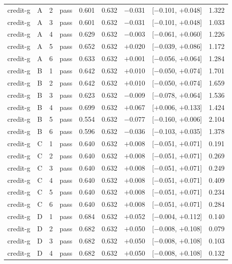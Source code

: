 {\begin{longtable}{lccl rrrcr}
credit-g & A & 2 & pass & 0.601 & 0.632 & $-$0.031 & [$-$0.101, $+$0.048] & 1.322 \\
credit-g & A & 3 & pass & 0.601 & 0.632 & $-$0.031 & [$-$0.101, $+$0.048] & 1.033 \\
credit-g & A & 4 & pass & 0.629 & 0.632 & $-$0.003 & [$-$0.061, $+$0.060] & 1.226 \\
credit-g & A & 5 & pass & 0.652 & 0.632 & $+$0.020 & [$-$0.039, $+$0.086] & 1.172 \\
credit-g & A & 6 & pass & 0.633 & 0.632 & $+$0.001 & [$-$0.056, $+$0.064] & 1.284 \\
\addlinespace[2pt]
credit-g & B & 1 & pass & 0.642 & 0.632 & $+$0.010 & [$-$0.050, $+$0.074] & 1.701 \\
credit-g & B & 2 & pass & 0.642 & 0.632 & $+$0.010 & [$-$0.050, $+$0.074] & 1.659 \\
credit-g & B & 3 & pass & 0.623 & 0.632 & $-$0.009 & [$-$0.078, $+$0.064] & 1.536 \\
credit-g & B & 4 & pass & 0.699 & 0.632 & $+$0.067 & [$+$0.006, $+$0.133] & 1.424 \\
credit-g & B & 5 & pass & 0.554 & 0.632 & $-$0.077 & [$-$0.160, $+$0.006] & 2.104 \\
credit-g & B & 6 & pass & 0.596 & 0.632 & $-$0.036 & [$-$0.103, $+$0.035] & 1.378 \\
\addlinespace[2pt]
credit-g & C & 1 & pass & 0.640 & 0.632 & $+$0.008 & [$-$0.051, $+$0.071] & 0.191 \\
credit-g & C & 2 & pass & 0.640 & 0.632 & $+$0.008 & [$-$0.051, $+$0.071] & 0.269 \\
credit-g & C & 3 & pass & 0.640 & 0.632 & $+$0.008 & [$-$0.051, $+$0.071] & 0.249 \\
credit-g & C & 4 & pass & 0.640 & 0.632 & $+$0.008 & [$-$0.051, $+$0.071] & 0.409 \\
credit-g & C & 5 & pass & 0.640 & 0.632 & $+$0.008 & [$-$0.051, $+$0.071] & 0.234 \\
credit-g & C & 6 & pass & 0.640 & 0.632 & $+$0.008 & [$-$0.051, $+$0.071] & 0.284 \\
\addlinespace[2pt]
credit-g & D & 1 & pass & 0.684 & 0.632 & $+$0.052 & [$-$0.004, $+$0.112] & 0.140 \\
credit-g & D & 2 & pass & 0.682 & 0.632 & $+$0.050 & [$-$0.008, $+$0.108] & 0.079 \\
credit-g & D & 3 & pass & 0.682 & 0.632 & $+$0.050 & [$-$0.008, $+$0.108] & 0.103 \\
credit-g & D & 4 & pass & 0.682 & 0.632 & $+$0.050 & [$-$0.008, $+$0.108] & 0.132 \\

\end{longtable}}
